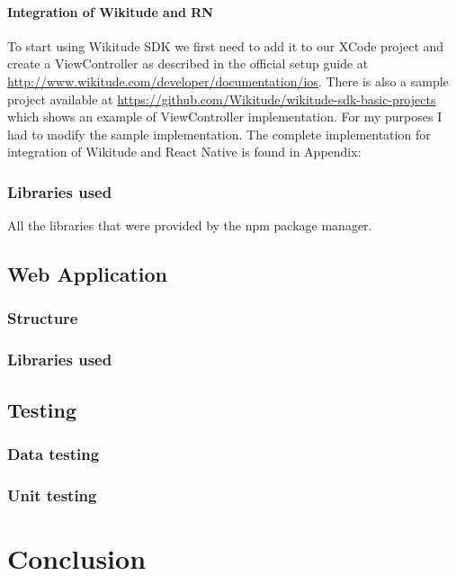 \documentclass[thesis=M,english]{FITthesis}[2012/10/20]
\begin{document}
\subsubsection{Integration of Wikitude and RN}
To start using Wikitude SDK we first need to add it to our XCode project and create a ViewController as described in the official setup guide at \url{http://www.wikitude.com/developer/documentation/ios}. There is also a sample project available at \url{https://github.com/Wikitude/wikitude-sdk-basic-projects} which shows an example of ViewController implementation. For my purposes I had to modify the sample implementation. The complete implementation for integration of Wikitude and React Native is found in Appendix: 

\subsection{Libraries used}

All the libraries that were provided by the npm package manager.


\section{Web Application}
\subsection{Structure}

\subsection{Libraries used}

\section{Testing}

\subsection{Data testing}


\subsection{Unit testing}

\chapter{Conclusion}
\end{document}
